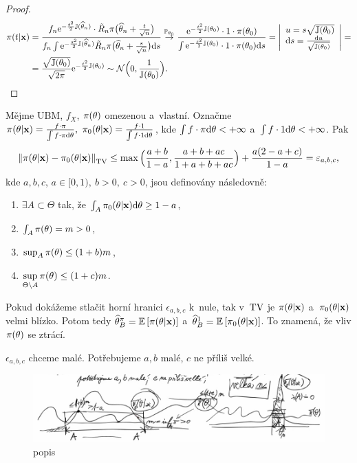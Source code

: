 \begin{dusl}
\begin{proof}
\[\begin{split}
		 \pi(t|\textbf{x})&=\frac{f_n\mathrm{e}^{-\frac{t^2}{2}\mathbb{J}(\widehat{\theta}_n)}\cdot\tilde{R}_n \pi\big( \widehat{\theta}_n+\frac{t}{\sqrt{n}} \big)}{f_n\int \mathrm{e}^{-\frac{s^2}{2}\mathbb{J}(\widehat{\theta}_n)}\tilde{R}_n \pi\big(\widehat{\theta}_n+\frac{s}{\sqrt{n}}\big)\mathrm{d} s}\stackrel{\mathbb{P}_{\theta_0}}{\to}\frac{\mathrm{e}^{-\frac{t^2}{2}\mathbb{J}(\theta_0)}\cdot1\cdot \pi(\theta_0)}{\int\mathrm{e}^{-\frac{s^2}{2}\mathbb{J}(\theta_0)}\cdot1\cdot\pi(\theta_0)\mathrm{d} s}=\left| \begin{array}{l}
		u=s\sqrt{\mathbb{J}(\theta_0)}\\\mathrm{d} s=\frac{\mathrm{d} u}{\sqrt{\mathbb{J}(\theta_0)}}		
		\end{array}
		\right|=\\&=\frac{\sqrt{\mathbb{J}(\theta_0)}}{\sqrt{2\pi}}\mathrm{e}^{-\frac{t^2}{2}\mathbb{J}(\theta_0)}\sim\mathcal{N}\Big( 0,\frac{1}{\mathbb{J}(\theta_0)} \Big).
		\end{split}
		\]
		\end{proof}
\end{dusl}
\begin{theorem}
	Mějme UBM, $f_X$, $\pi(\theta)$ omezenou a~vlastní. Označme $\pi(\theta|\textbf{x})=\frac{f\cdot\pi}{\int f\cdot\pi\mathrm{d}\theta},~\pi_0(\theta|\textbf{x})=\frac{f\cdot1}{\int f\cdot1 \mathrm{d}\theta}$, kde $\int f\cdot\pi\mathrm{d}\theta<+\infty$ a~$\int f\cdot1 \mathrm{d}\theta<+\infty$. Pak
	$$ \left\|\pi(\theta|\textbf{x})-\pi_0(\theta|\textbf{x})\right\|_{\mathrm{TV}}\leq \max\Big(\frac{a+b}{1-a},\frac{a+b+ac}{1+a+b+ac}\Big)+\frac{a(2-a+c)}{1-a}=\varepsilon_{a,b,c},$$
	kde $a,b,c$, $a\in[0,1),~b>0,~c>0$, jsou definovány následovně:\begin{enumerate}[1)]
		\item $\exists A\subset \Theta$ tak, že $\int_A \pi_0(\theta|\textbf{x})\mathrm{d}\theta\geq 1-a$,
		\item $\int_A \pi(\theta)=m>0$,
		\item $\sup_A \pi(\theta)\leq (1+b)m$,
		\item $\sup\limits_{\Theta\setminus A} \pi(\theta)\leq(1+c)m$. 
	\end{enumerate}
\end{theorem}
\begin{dusl}
	Pokud dokážeme stlačit horní hranici $\epsilon_{a,b,c}$ k~nule, tak v~$\mathrm{TV}$ je $\pi(\theta|\textbf{x})$ a~$\pi_0(\theta|\textbf{x})$ velmi blízko. Potom tedy $\widehat{\theta}_B^\pi=\mathbb{E}\left[ \pi(\theta|\textbf{x}) \right]$ a~$\widehat{\theta}_B^1=\mathbb{E}\left[ \pi_0(\theta|\textbf{x}) \right]$. To znamená, že vliv $\pi(\theta)$ se ztrácí.
\end{dusl}\newpage
\begin{remark}
	$\epsilon_{a,b,c}$ chceme malé. Potřebujeme $a,b$ malé, $c$ ne příliš velké.
	
	\begin{figure}[h]
		\centering
		\includegraphics[width=0.95\linewidth]{pictures/P6_1}
		\caption{popis}
		\label{fig:p61}
	\end{figure}
	
\end{remark}